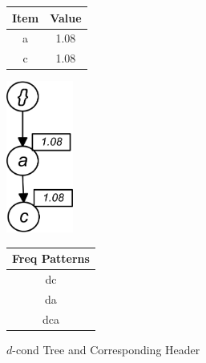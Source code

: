 %
\begin{figure}
\begin{minipage}{0.40\textwidth}
  \centering
	\begin{center}
	\begin{tabular}{ |c|c| } 
 	\hline
 		Item&Value\\ \hline\hline
 		a &  1.08  	\\ \hline
 		c &  1.08   	\\ \hline
 		
\end{tabular}
\end{center}  
\end{minipage}
  \hfill
\hfill
\begin{minipage}{0.23\textwidth}
  \centering
  \hfill
  \includegraphics[width=.8\textwidth, height=5cm]{images/D_COND.jpg}
  \hfill
\end{minipage}
\hfill
\begin{minipage}{0.30\textwidth}
  \centering
  
	\begin{center}
	\begin{tabular}{ |c| } 
 	\hline
 		Freq Patterns \\ \hline\hline
 		dc  	\\ \hline
 		da   	\\ \hline
 		dca   	\\ \hline
 		
\end{tabular}
\end{center}  
\end{minipage}
\caption{$d$-cond Tree and Corresponding Header}
\label{figure:d_cond}
\end{figure}
